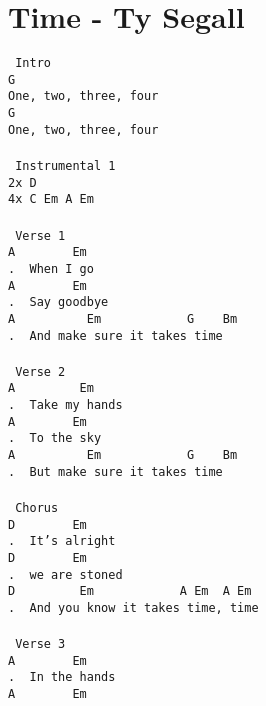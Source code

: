\newpage
\section{Time - Ty Segall}
\label{Time - Ty Segall}
\texttt{\lbrack\ Intro\rbrack\\
G\\
One,\ two,\ three,\ four\\
G\\
One,\ two,\ three,\ four\\
\\
\lbrack\ Instrumental\ 1\rbrack\\
2x\ D\\
4x\ C\ Em\ A\ Em\\
\\
\lbrack\ Verse\ 1\rbrack\\
A\ \ \ \ \ \ \ \ Em\\
. \ When\ I\ go\\
A\ \ \ \ \ \ \ \ Em\\
. \ Say\ goodbye\\
A\ \ \ \ \ \ \ \ \ \ Em\ \ \ \ \ \ \ \ \ \ \ \ G\ \ \ \ Bm\\
. \ And\ make\ sure\ it\ takes\ time\\
\\
\lbrack\ Verse\ 2\rbrack\\
A\ \ \ \ \ \ \ \ \ Em\\
. \ Take\ my\ hands\\
A\ \ \ \ \ \ \ \ Em\\
. \ To\ the\ sky\\
A\ \ \ \ \ \ \ \ \ \ Em\ \ \ \ \ \ \ \ \ \ \ \ G\ \ \ \ Bm\\
. \ But\ make\ sure\ it\ takes\ time\\
\\
\lbrack\ Chorus\rbrack\\
D\ \ \ \ \ \ \ \ Em\\
. \ It's\ alright\\
D\ \ \ \ \ \ \ \ Em\\
. \ we\ are\ stoned\\
D\ \ \ \ \ \ \ \ \ Em\ \ \ \ \ \ \ \ \ \ \ \ A\ Em\ \ A\ Em\\
. \ And\ you\ know\ it\ takes\ time,\ time\\
\\
\lbrack\ Verse\ 3\rbrack\\
A\ \ \ \ \ \ \ \ Em\\
. \ In\ the\ hands\\
A\ \ \ \ \ \ \ \ Em\\
}
